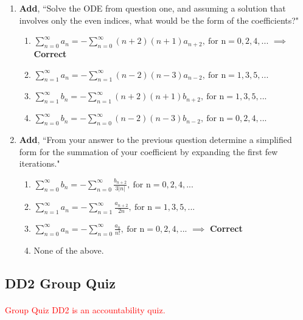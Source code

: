 \documentclass[11pt]{article}
\begin{document}
\begin{enumerate}
	\item \textbf{Add}, ``Solve the ODE from question one, and assuming a solution that involves only the even indices, what would be the form of the coefficients?"
	
		\begin{enumerate}
			\item \(\sum_{n=0}^{\infty} a_n=-\sum_{n=0}^{\infty}(n+2)(n+1)a_{n+2},\ \textrm{for n}={0,2,4,...}\) $\implies$ \textbf{Correct}
			\item \(\sum_{n=1}^{\infty} a_n=-\sum_{n=1}^{\infty}(n-2)(n-3)a_{n-2},\ \textrm{for n}={1,3,5,...}\)
			\item \(\sum_{n=1}^{\infty} b_n=-\sum_{n=1}^{\infty}(n+2)(n+1)b_{n+2},\ \textrm{for n}={1,3,5,...}\)
			\item \(\sum_{n=0}^{\infty} b_n=-\sum_{n=0}^{\infty}(n-2)(n-3)b_{n-2},\ \textrm{for n}={0,2,4,...}\)
		\end{enumerate}
		
	\item \textbf{Add}, ``From your answer to the previous question determine a simplified form for the summation of your coefficient by expanding the first few iterations."
	
		\begin{enumerate}
			\item \(\sum_{n=0}^{\infty} b_n=-\sum_{n=0}^{\infty}\frac{b_{n+2}}{3|n|},\ \textrm{for n}={0,2,4,...}\)
			\item \(\sum_{n=1}^{\infty} a_n=-\sum_{n=1}^{\infty}\frac{a_{n+2}}{2n},\ \textrm{for n}={1,3,5,...}\)
			\item \(\sum_{n=0}^{\infty} a_n=-\sum_{n=0}^{\infty}\frac{a_{0}}{n!},\ \textrm{for n}={0,2,4,...}\) $\implies$ \textbf{Correct}
			\item None of the above.
		\end{enumerate}
		
\end{enumerate}

\subsection*{DD2 Group Quiz}

\paragraph{}\textcolor{red}{Group Quiz DD2 is an accountability quiz.}
\end{document}

